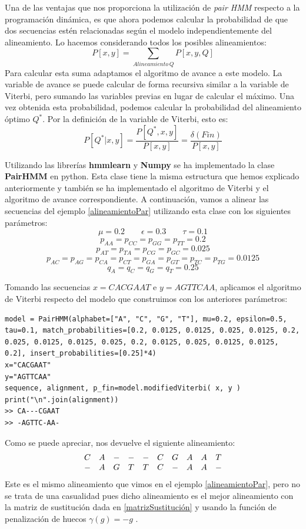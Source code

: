 Una de las ventajas que nos proporciona la utilización de \textit{pair HMM} respecto a la programación dinámica, es que ahora podemos calcular la probabilidad de que dos secuencias estén relacionadas según el modelo independientemente del alineamiento. Lo hacemos considerando todos los posibles alineamientos:
\[P[x,y]=\sum_{Alineamiento\, Q}P[x,y,Q]\]
Para calcular esta suma adaptamos el algoritmo de avance a este modelo. La variable de avance se puede calcular de forma recursiva similar a la variable de Viterbi, pero sumando las variables previas en lugar de calcular el máximo. Una vez obtenida esta probabilidad, podemos calcular la probabilidad del alineamiento óptimo $Q^*$. Por la definición de la variable de Viterbi, esto es:
\[P[Q^*|x,y]=\dfrac{P[Q^*, x,y]}{P[x,y]}=\dfrac{\delta(Fin)}{P[x,y]}\]

\begin{exampleth}
Utilizando las librerías \textbf{hmmlearn} y \textbf{Numpy} se ha implementado la clase \textbf{PairHMM} en python. Esta clase tiene la misma estructura que hemos explicado anteriormente y también se ha implementado el algoritmo de Viterbi y el algoritmo de avance correspondiente. A continuación, vamos a alinear las secuencias del ejemplo \ref{alineamientoPar} utilizando esta clase con los siguientes parámetros:
\[\mu=0.2 \qquad \epsilon=0.3 \qquad \tau=0.1\]
\[p_{AA}=p_{CC}=p_{GG}=p_{TT}=0.2\]
\[p_{AT}=p_{TA}=p_{CG}=p_{GC}=0.025\]
\[p_{AC}=p_{AG}=p_{CA}=p_{CT}=p_{GA}=p_{GT}=p_{TC}=p_{TG}=0.0125\]
\[q_A=q_C=q_G=q_T=0.25\]

Tomando las secuencias $x=CACGAAT$ e $y=AGTTCAA$, aplicamos el algoritmo de Viterbi respecto del modelo que construimos con los anteriores parámetros:

\begin{verbatim}
model = PairHMM(alphabet=["A", "C", "G", "T"], mu=0.2, epsilon=0.5, tau=0.1, match_probabilities=[0.2, 0.0125, 0.0125, 0.025, 0.0125, 0.2, 0.025, 0.0125, 0.0125, 0.025, 0.2, 0.0125, 0.025, 0.0125, 0.0125, 0.2], insert_probabilities=[0.25]*4)
x="CACGAAT"
y="AGTTCAA"
sequence, alignment, p_fin=model.modifiedViterbi( x, y )
print("\n".join(alignment))
>> CA---CGAAT
>> -AGTTC-AA-
\end{verbatim}

Como se puede apreciar, nos devuelve el siguiente alineamiento:
    \[\begin{array}{c c c c c c c c c c}
        C & A & -& -& -& C& G& A& A& T \\
        -& A& G& T& T& C& -& A& A& -
    \end{array}\]
Este es el mismo alineamiento que vimos en el ejemplo \ref{alineamientoPar}, pero no se trata de una casualidad pues dicho alineamiento es el mejor alineamiento con la matriz de sustitución dada en \eqref{matrizSustitución} y usando la función de penalización de huecos $\gamma(g)=-g$ \cite{Vidyasagar}.


\end{exampleth}
